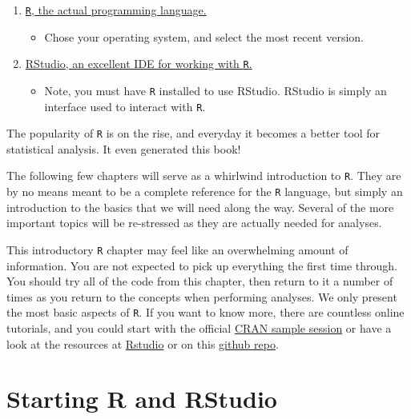\documentclass[]{book}
\providecommand{\tightlist}{%
  \setlength{\itemsep}{0pt}\setlength{\parskip}{0pt}}
\begin{document}
\begin{enumerate}
\def\labelenumi{\arabic{enumi}.}
\tightlist
\item
  \href{https://www.r-project.org}{\texttt{R}, the actual programming language.}

  \begin{itemize}
  \tightlist
  \item
    Chose your operating system, and select the most recent version.
  \end{itemize}
\item
  \href{http://www.rstudio.com/}{RStudio, an excellent IDE for working with \texttt{R}.}

  \begin{itemize}
  \tightlist
  \item
    Note, you must have \texttt{R} installed to use RStudio. RStudio is simply an interface used to interact with \texttt{R}.
  \end{itemize}
\end{enumerate}

The popularity of \texttt{R} is on the rise, and everyday it becomes a better tool for statistical analysis. It even generated this book!

The following few chapters will serve as a whirlwind introduction to \texttt{R}. They are by no means meant to be a complete reference for the \texttt{R} language, but simply an introduction to the basics that we will need along the way. Several of the more important topics will be re-stressed as they are actually needed for analyses.

This introductory \texttt{R} chapter may feel like an overwhelming amount of information. You are not expected to pick up everything the first time through. You should try all of the code from this chapter, then return to it a number of times as you return to the concepts when performing analyses. We only present the most basic aspects of \texttt{R}. If you want to know more, there are countless online tutorials, and you could start with the official \href{https://cran.r-project.org/doc/manuals/r-release/R-intro.html\#A-sample-session}{CRAN sample session} or have a look at the resources at \href{https://www.rstudio.com/online-learning/\#DataScience}{Rstudio} or on this \href{https://github.com/qinwf/awesome-R}{github repo}.

\hypertarget{starting-r-and-rstudio}{%
\section{Starting R and RStudio}\label{starting-r-and-rstudio}}
\end{document}
